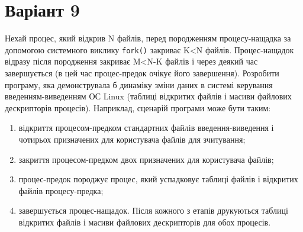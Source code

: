 \documentclass{article}
\newcommand{\nitem}{\item \vspace{-2mm}}
\begin{document}
 
\large
\section*{Варіант 9}

Нехай процес, який відкрив N файлів, перед породженням процесу-нащадка за допомогою системного виклику \texttt{fork()} закриває K<N файлів.
Процес-нащадок відразу після породження закриває M<N-K файлів і через
деякий час завершується (в цей час процес-предок очікує його завершення).
Розробити програму, яка демонструвала б динаміку зміни даних в системі
керування введенням-виведенням ОС Linux (таблиці відкритих файлів і
масиви файлових дескрипторів процесів). Наприклад, сценарій програми
може бути таким:

\begin{enumerate}
\nitem відкриття процесом-предком стандартних файлів введення-виведення і
чотирьох призначених для користувача файлів для зчитування;
\nitem закриття процесом-предком двох призначених для користувача файлів;
\nitem процес-предок породжує процес, який успадковує таблиці файлів і
відкритих файлів процесу-предка;
\nitem завершується процес-нащадок.
Після кожного з етапів друкуються таблиці відкритих файлів і масиви
файлових дескрипторів для обох процесів.
\end{enumerate}
\end{document}
